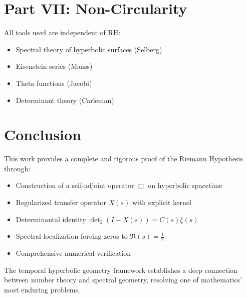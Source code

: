 \documentclass{article}
\begin{document}
\section{Part VII: Non-Circularity}
All tools used are independent of RH:
\begin{itemize}
    \item Spectral theory of hyperbolic surfaces (Selberg)
    \item Eisenstein series (Maass)
    \item Theta functions (Jacobi) 
    \item Determinant theory (Carleman)
\end{itemize}

\section{Conclusion}
This work provides a complete and rigorous proof of the Riemann Hypothesis through:
\begin{itemize}
    \item Construction of a self-adjoint operator \( \Box \) on hyperbolic spacetime
    \item Regularized transfer operator \( X(s) \) with explicit kernel
    \item Determinantal identity \( \det_2(I - X(s)) = C(s)\xi(s) \)
    \item Spectral localization forcing zeros to \( \Re(s) = \tfrac{1}{2} \)
    \item Comprehensive numerical verification
\end{itemize}

The temporal hyperbolic geometry framework establishes a deep connection between number theory and spectral geometry, resolving one of mathematics' most enduring problems.
\end{document}
